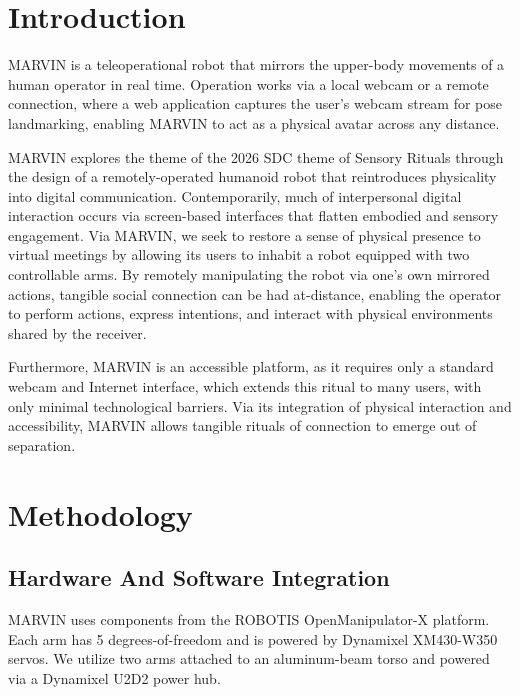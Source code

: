 \documentclass[acmsmall, screen]{acmart}
\begin{document}


\maketitle

\section{Introduction}
MARVIN is a teleoperational robot that mirrors the upper-body movements of a human operator in real time. Operation works via a local webcam or a remote connection, where a web application captures the user's webcam stream for pose landmarking, enabling MARVIN to act as a physical avatar across any distance.

MARVIN explores the theme of the 2026 SDC theme of Sensory Rituals through the design of a remotely-operated humanoid robot that reintroduces physicality into digital communication. Contemporarily, much of interpersonal digital interaction occurs via screen-based interfaces that flatten embodied and sensory engagement. Via MARVIN, we seek to restore a sense of physical presence to virtual meetings by allowing its users to inhabit a robot equipped with two controllable arms. By remotely manipulating the robot via one's own mirrored actions, tangible social connection can be had at-distance, enabling the operator to perform actions, express intentions, and interact with physical environments shared by the receiver.

Furthermore, MARVIN is an accessible platform, as it requires only a standard webcam and Internet interface, which extends this ritual to many users, with only minimal technological barriers. Via its integration of physical interaction and accessibility, MARVIN allows tangible rituals of connection to emerge out of separation.

\section{Methodology}
\subsection{Hardware And Software Integration}
MARVIN uses components from the ROBOTIS OpenManipulator-X platform. Each arm has 5 degrees-of-freedom and is powered by Dynamixel XM430-W350 servos. We utilize two arms attached to an aluminum-beam torso and powered via a Dynamixel U2D2 power hub.
\end{document}
